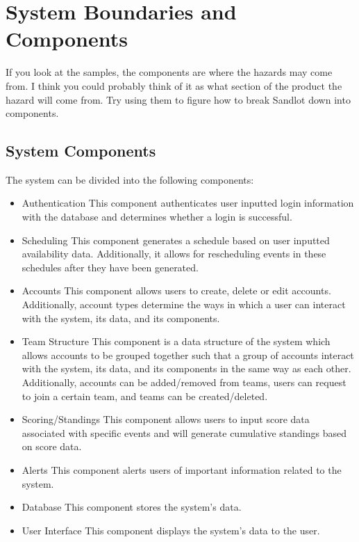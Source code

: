\documentclass{article}
\begin{document}
\section{System Boundaries and Components}


If you look at the samples, the components are where the hazards may come from.
I think you could probably think of it as what section of the product the hazard will come from.
Try using them to figure how to break Sandlot down into components.

\subsection{System Components}
The system can be divided into the following components:
\begin{itemize}
    \item Authentication
    \subitem This component authenticates user inputted login information with the database
    and determines whether a login is successful.
    \item Scheduling
    \subitem This component generates a schedule based on user inputted availability data. 
    Additionally, it allows for rescheduling events in these schedules after they 
    have been generated.
    \item Accounts
    \subitem This component allows users to create, delete or edit accounts. Additionally, account types 
    determine the ways in which a user can interact with the system, its data, and its components.
    \item Team Structure
    \subitem This component is a data structure of the system which allows accounts to be grouped together 
    such that a group of accounts interact with the system, its data, and its components in the same way as 
    each other. Additionally, accounts can be added/removed from teams, users can request to join a 
    certain team, and teams can be created/deleted.
    \item Scoring/Standings
    \subitem This component allows users to input score data associated with specific events and will 
    generate cumulative standings based on score data.
    \item Alerts
    \subitem This component alerts users of important information related to the system.
    \item Database
    \subitem This component stores the system's data.
    \item User Interface
    \subitem This component displays the system's data to the user.
\end{itemize}
\end{document}
